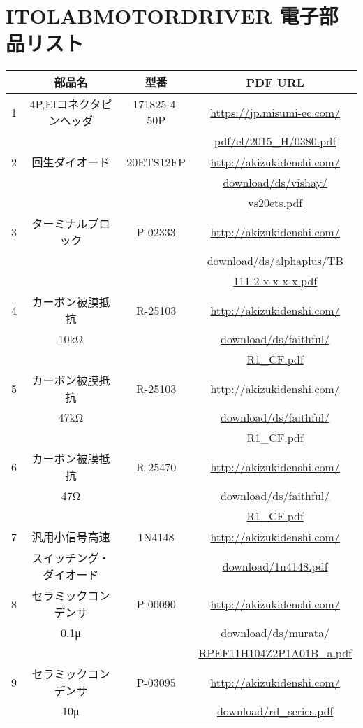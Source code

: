 \chapter{ITOLABMOTORDRIVER 電子部品リスト}
\begin{tabular}{|c|c|c|c|} \hline
 &部品名&型番&PDF URL\\ \hline
 1&4P,EIコネクタピンヘッダ&171825-4-50P&\url{https://jp.misumi-ec.com/}\\
 &                       &            &\url{pdf/el/2015_H/0380.pdf}\\ \hline
2&回生ダイオード&20ETS12FP&\url{http://akizukidenshi.com/}\\
 &              &         &\url{download/ds/vishay/}\\
 &              &         &\url{vs20ets.pdf}\\ \hline
3&ターミナルブロック&P-02333&\url{http://akizukidenshi.com/}\\
 &                  &       &\url{download/ds/alphaplus/TB}\\
 &                  &       &\url{111-2-x-x-x-x.pdf}\\ \hline
4&カーボン被膜抵抗&R-25103&\url{http://akizukidenshi.com/}\\
 &10kΩ&       &\url{download/ds/faithful/}\\
 &     &       &\url{R1_CF.pdf}\\ \hline
5&カーボン被膜抵抗&R-25103&\url{http://akizukidenshi.com/}\\
 &47kΩ&       &\url{download/ds/faithful/}\\
 &     &       &\url{R1_CF.pdf}\\ \hline
6&カーボン被膜抵抗&R-25470&\url{http://akizukidenshi.com/}\\
 &47Ω&       &\url{download/ds/faithful/}\\
 &    &       &\url{R1_CF.pdf}\\ \hline
7&汎用小信号高速&1N4148&\url{http://akizukidenshi.com/}\\
 &スイッチング・ダイオード&      &\url{download/1n4148.pdf}\\ \hline
8&セラミックコンデンサ&P-00090&\url{http://akizukidenshi.com/}\\
 &0.1μ&       &\url{download/ds/murata/}\\
 &     &       &\url{RPEF11H104Z2P1A01B_a.pdf}\\ \hline
9&セラミックコンデンサ&P-03095&\url{http://akizukidenshi.com/}\\
 &10μ&        &\url{download/rd_series.pdf}\\ \hline
\end{tabular}
